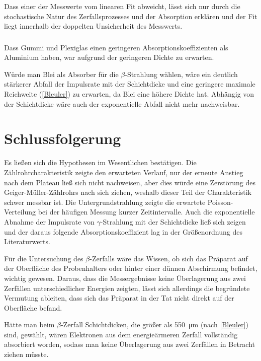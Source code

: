 \documentclass[
	a4paper,
	12pt,
	pagesize,
	ngerman
]{scrartcl}
\begin{document}
	Dass einer der Messwerte vom linearen Fit abweicht, lässt sich nur durch die stochastische Natur des Zerfallsprozesses und der Absorption erklären und der Fit liegt innerhalb der doppelten Unsicherheit des Messwerts.
	
	\subsubsection*{}
	Dass Gummi und Plexiglas einen geringeren Absorptionskoeffizienten als Aluminium haben, war aufgrund der geringeren Dichte zu erwarten.
	\par
	Würde man Blei als Absorber für die $\beta$-Strahlung wählen, wäre ein deutlich stärkerer Abfall der Impulsrate mit der Schichtdicke und eine geringere maximale Reichweite (\cref{Bleuler}) zu erwarten, da Blei eine höhere Dichte hat.
	Abhängig von der Schichtdicke wäre auch der exponentielle Abfall nicht mehr nachweisbar.
	
	\section{Schlussfolgerung}
	Es ließen sich die Hypothesen im Wesentlichen bestätigen.
	Die Zählrohrcharakteristik zeigte den erwarteten Verlauf, nur der erneute Anstieg nach dem Plateau ließ sich nicht nachweisen, aber dies würde eine Zerstörung des Geiger-Müller-Zählrohrs nach sich ziehen, weshalb dieser Teil der Charakteristik schwer messbar ist.
	Die Untergrundstrahlung zeigte die erwartete Poisson-Verteilung bei der häufigen Messung kurzer Zeitintervalle.
	Auch die exponentielle Abnahme der Impulsrate von $\gamma$-Strahlung mit der Schichtdicke ließ sich zeigen und der daraus folgende Absorptionskoeffizient lag in der Größenordnung des Literaturwerts.
	
	Für die Untersuchung des $\beta$-Zerfalls wäre das Wissen, ob sich das Präparat auf der Oberfläche des Probenhalters oder hinter einer dünnen Abschirmung befindet, wichtig gewesen.
	Daraus, dass die Messergebnisse keine Überlagerung aus zwei Zerfällen unterschiedlicher Energien zeigten, lässt sich allerdings die begründete Vermutung ableiten, dass sich das Präparat in der Tat nicht direkt auf der Oberfläche befand.
	
	Hätte man beim $\beta$-Zerfall Schichtdicken, die größer als \SI{550}{\micro \meter} (nach \cref{Bleuler}) sind, gewählt, wären Elektronen aus dem energieärmeren Zerfall vollständig absorbiert worden, sodass man keine Überlagerung aus zwei Zerfällen in Betracht ziehen müsste.
	\printbibliography
\end{document}
